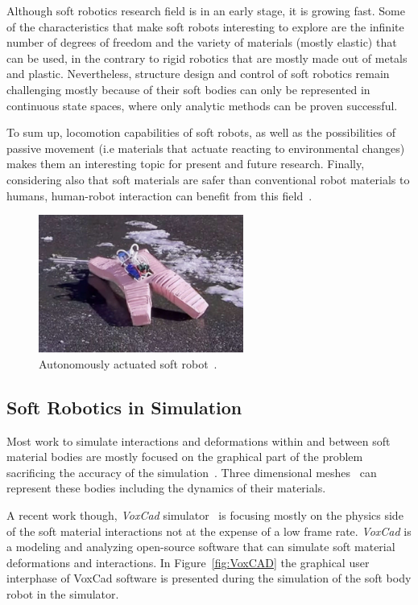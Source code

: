 Although soft robotics research field is in an early stage, it is growing fast. Some of the characteristics that make soft robots interesting to explore are the infinite number of degrees of freedom and the variety of materials (mostly elastic) that can be used, in the contrary to rigid robotics that are mostly made out of metals and plastic. Nevertheless, structure design and control of soft robotics remain challenging mostly because of their soft bodies can only be represented in continuous state spaces, where only analytic methods can be proven successful.

To sum up, locomotion capabilities of soft robots, as well as the possibilities of passive movement (i.e materials that actuate reacting to environmental changes) makes them an interesting topic for present and future research. Finally, considering also that soft materials are safer than conventional robot materials to humans, human-robot interaction can benefit from this field~\citep{sanan2011continuum}.


\begin{figure}[t!]
\centering
\includegraphics[width=0.6\textwidth]{../Figures/Misc/softbot.jpg}
\caption{Autonomously actuated soft robot~\citep{tolleyresilient}.}
\label{fig:softbot}
\end{figure}


\subsection{Soft Robotics in Simulation}

Most work to simulate interactions and deformations within and between soft material bodies are mostly focused on the graphical part of the problem~\citep{faloutsos1997dynamic} sacrificing the accuracy of the simulation~\citep{teschner2004versatile}. Three dimensional meshes~\citep{muller2002stable} can represent these bodies including the dynamics of their materials. 

A recent work though, \emph{VoxCad} simulator~\citep{hiller2012dynamic} is focusing mostly on the physics side of the soft material interactions not at the expense of a low frame rate. \emph{VoxCad} is a modeling and analyzing open-source software that can simulate soft material deformations and interactions. In Figure~\ref{fig:VoxCAD} the graphical user interphase of VoxCad software is presented during the simulation of the soft body robot in the simulator.

